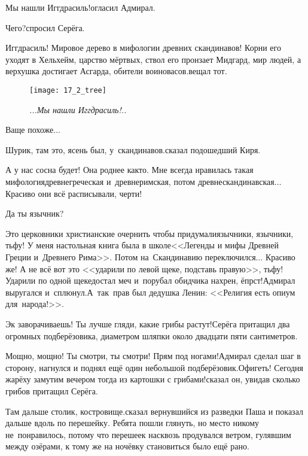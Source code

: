 \diagdash Мы нашли Иггдрасиль!\mdash огласил Адмирал.

\diagdash Чего?\mdash спросил Серёга.

\diagdash Иггдрасиль! Мировое дерево в мифологии древних скандинавов! Корни его уходят в Хельхейм, царство мёртвых, ствол его пронзает Мидгард, мир людей, а верхушка достигает Асгарда, обители воинов\sdash асов.\mdash вещал тот. 

\begin{wrapfigure}[20]{r}{0.55\textwidth}
\centering
\texttt{[image: 17\_2\_tree]}
\caption{\small\textit{...Мы нашли Иггдрасиль!..}}
\end{wrapfigure}
\diagdash Ваще похоже$\ldots$

\diagdash Шурик, там это, ясень был, у~скандинавов.\mdash сказал подошедший Киря.

\diagdash А у нас сосна будет! Она роднее как\sdash то. Мне всегда нравилась такая мифология\mdash древнегреческая и~древнеримская, потом древнескандинавская$\ldots$ Красиво они всё расписывали, черти!

\diagdash Да ты язычник?

\diagdash Это церковники христианские очернить чтобы придумали\mdash язычники, язычники, тьфу! У меня настольная книга была в школе\mdash <<Легенды и мифы Древней Греции и~Древнего Рима>>\cite{Кун}. Потом на~Скандинавию переключился$\ldots$ Красиво же! А не всё вот это <<ударили по левой щеке, подставь правую>>, тьфу! Ударили по одной щеке\mdash достал меч и~порубал обидчика нахрен, ёпрст!\mdash Адмирал выругался и~сплюнул.\mdash А~так~прав был дедушка Ленин: <<Религия есть  опиум для~народа!>>\cite{ЛенинОпиумДляНарода}. 

\diagdash Эк заворачиваешь! Ты лучше гляди, какие грибы растут!\mdash Серёга притащил два огромных подберёзовика, диаметром шляпки около двадцати пяти сантиметров.  

\diagdash Мощно, мощно! Ты смотри, ты смотри! Прям под ногами!\mdash Адмирал сделал шаг в сторону, нагнулся и поднял ещё один небольшой подберёзовик.\mdash Офигеть! Сегодня жарёху замутим вечером тогда из картошки с грибами!\mdash сказал он, увидав сколько грибов притащил Серёга. 

\diagdash Там дальше столик, костровище.\mdash сказал вернувшийся из разведки Паша и показал дальше вдоль по перешейку. Ребята пошли глянуть, но место никому не~понравилось, потому что перешеек насквозь продувался ветром, гулявшим между озёрами, к тому же на ночёвку становиться было ещё рано. 

